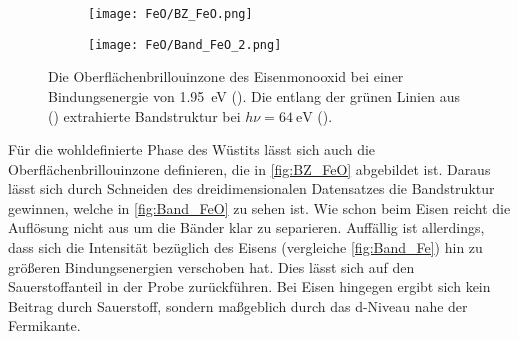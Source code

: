         \begin{figure}
            \begin{subfigure}[t]{0.34\textwidth}
                \centering
                \texttt{[image: FeO/BZ\_FeO.png]}
                \subcaption{}
                \label{fig:BZ_FeO}
            \end{subfigure}
            \begin{subfigure}[t]{0.62\textwidth}
                \centering
                \texttt{[image: FeO/Band\_FeO\_2.png]}
                \subcaption{}
                \label{fig:Band_FeO}
            \end{subfigure}
            \caption{Die Oberflächenbrillouinzone des Eisenmonooxid bei einer Bindungsenergie von \SI{1.95}{\electronvolt} ().
            Die entlang der grünen Linien aus () extrahierte Bandstruktur bei $h\nu = \SI{64}{\electronvolt}$ ().}
        \end{figure}
        Für die wohldefinierte Phase des Wüstits lässt sich auch die Oberflächenbrillouinzone definieren, die in \autoref{fig:BZ_FeO} abgebildet ist.
        Daraus lässt sich durch Schneiden des dreidimensionalen Datensatzes die Bandstruktur gewinnen, welche in \autoref{fig:Band_FeO} zu sehen ist.
        Wie schon beim Eisen reicht die Auflösung nicht aus um die Bänder klar zu separieren.
        Auffällig ist allerdings, dass sich die Intensität bezüglich des Eisens (vergleiche \autoref{fig:Band_Fe}) hin zu größeren Bindungsenergien verschoben hat.
        Dies lässt sich auf den Sauerstoffanteil in der Probe zurückführen. 
        Bei Eisen hingegen ergibt sich kein Beitrag durch Sauerstoff, sondern maßgeblich durch das d-Niveau nahe der Fermikante.
    
